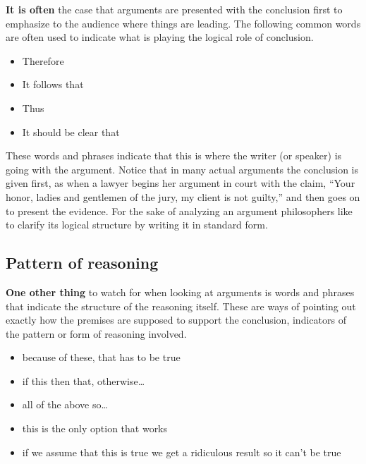 \documentclass[]{book}
\makeatletter
\providecommand{\tightlist}{%
  \setlength{\itemsep}{0pt}\setlength{\parskip}{0pt}}
\newenvironment{kframe}{%
\medskip{}
\setlength{\fboxsep}{.8em}
 \def\at@end@of@kframe{}%
 \ifinner\ifhmode%
  \def\at@end@of@kframe{\end{minipage}}%
  \begin{minipage}{\columnwidth}%
 \fi\fi%
 \def\FrameCommand##1{\hskip\@totalleftmargin \hskip-\fboxsep
 \colorbox{shadecolor}{##1}\hskip-\fboxsep
     \hskip-\linewidth \hskip-\@totalleftmargin \hskip\columnwidth}%
 \MakeFramed {\advance\hsize-\width
   \@totalleftmargin\z@ \linewidth\hsize
   \@setminipage}}%
 {\par\unskip\endMakeFramed%
 \at@end@of@kframe}
\newenvironment{rmdblock}[1]
  {
  \begin{itemize}
  \renewcommand{\labelitemi}{
    \raisebox{-.7\height}[0pt][0pt]{
      {\setkeys{Gin}{width=3em,keepaspectratio}\texttt{[image: img/\#1]}}
    }
  }
  \setlength{\fboxsep}{1em}
  \begin{kframe}
  \item
  }
  {
  \end{kframe}
  \end{itemize}
  }
\newenvironment{rmdnote}
  {\begin{rmdblock}{note}}
  {\end{rmdblock}}
\makeatother
\begin{document}
\textbf{It is often} the case that arguments are presented with the conclusion first to emphasize to the audience where things are leading. The following common words are often used to indicate what is playing the logical role of conclusion.

\begin{rmdnote}
\begin{itemize}
\tightlist
\item
  Therefore
\item
  It follows that
\item
  Thus
\item
  It should be clear that
\end{itemize}
\end{rmdnote}

These words and phrases indicate that this is where the writer (or speaker) is going with the argument. Notice that in many actual arguments the conclusion is given first, as when a lawyer begins her argument in court with the claim, ``Your honor, ladies and gentlemen of the jury, my client is not guilty,'' and then goes on to present the evidence. For the sake of analyzing an argument philosophers like to clarify its logical structure by writing it in standard form.

\hypertarget{pattern-of-reasoning}{%
\subsection*{Pattern of reasoning}\label{pattern-of-reasoning}}


\textbf{One other thing} to watch for when looking at arguments is words and phrases that indicate the structure of the reasoning itself. These are ways of pointing out exactly how the premises are supposed to support the conclusion, indicators of the pattern or form of reasoning involved.

\begin{rmdnote}
\begin{itemize}
\tightlist
\item
  because of these, that has to be true
\item
  if this then that, otherwise\ldots{}
\item
  all of the above so\ldots{}
\item
  this is the only option that works
\item
  if we assume that this is true we get a ridiculous result so it can't
  be true
\end{itemize}
\end{rmdnote}
\end{document}
